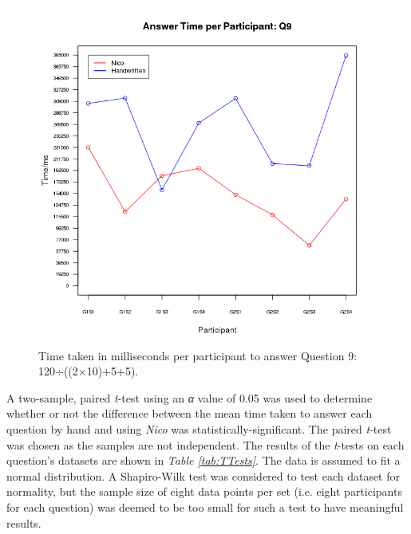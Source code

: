 \documentclass[12pt,twoside,notitlepage,xetex]{report}
\begin{document}
{\begin{center}
\begin{figure}[H]
\begin{center}
\includegraphics[width=\textwidth-2cm]{figs/graphs/q9.png}
\end{center}
\caption{Time taken in milliseconds per participant to answer Question 9: 120÷((2×10)+5+5).}
\label{fig:PlotQ9}
\end{figure}
\end{center}

A two-sample, paired \emph{t}-test using an \emph{α} value of 0.05 was used to
determine whether or not the difference between the mean time taken to answer
each question by hand and using \emph{Nico} was statistically-significant.  The
paired \emph{t}-test was chosen as the samples are not independent.  The
results of the \emph{t}-tests on each question's datasets are shown in
\emph{Table \ref{tab:TTests}}.  The data is assumed to fit a normal distribution.  A
Shapiro-Wilk test was considered to test each dataset for normality, but the
sample size of eight data points per set (i.e. eight participants for each
question) was deemed to be too small for such a test to have meaningful results.

}
\end{document}
